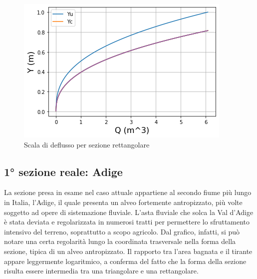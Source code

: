 \documentclass[12pt]{article} %
\begin{document}
\begin{figure}[H]
    \centering
    \includegraphics[scale=0.8]{deflussotri.png}
    \caption{Scala di deflusso per sezione rettangolare}
    \label{fig:rettangolare_scala_deflusso}
\end{figure}

\subsection{1° sezione reale: Adige}
\noindent La sezione presa in esame nel caso attuale appartiene al secondo fiume più lungo in Italia, l’Adige, il quale presenta un alveo fortemente antropizzato, più volte soggetto ad opere di sistemazione fluviale. 
L’asta fluviale che solca la Val d’Adige è stata deviata e regolarizzata in numerosi tratti per permettere lo sfruttamento intensivo del terreno, soprattutto a scopo agricolo. 
Dal grafico, infatti, si può notare una certa regolarità lungo la coordinata trasversale nella forma della sezione, tipica di un alveo antropizzato. Il rapporto tra l’area bagnata e il tirante appare leggermente logaritmico, a conferma del fatto che la forma della sezione risulta essere intermedia tra una triangolare e una rettangolare.
\end{document}
